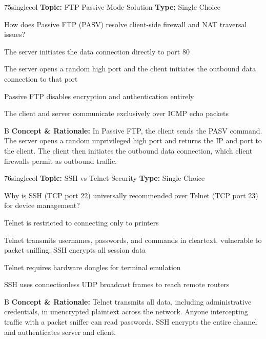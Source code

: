 \begin{qcard}{75}{singlecol}
\textcolor{darkslate!75}{\small\textbf{Topic:} FTP Passive Mode Solution \hfill \textbf{Type:} Single Choice}\vspace{0.4em}\par
How does Passive FTP (PASV) resolve client-side firewall and NAT traversal issues?
\begin{qoptions}
\item The server initiates the data connection directly to port 80
\item The server opens a random high port and the client initiates the outbound data connection to that port
\item Passive FTP disables encryption and authentication entirely
\item The client and server communicate exclusively over ICMP echo packets
\end{qoptions}
\end{qcard}
\nopagebreak
\begin{explainbox}{B}
\textbf{Concept \& Rationale:} In Passive FTP, the client sends the PASV command. The server opens a random unprivileged high port and returns the IP and port to the client. The client then initiates the outbound data connection, which client firewalls permit as outbound traffic.
\end{explainbox}

\begin{qcard}{76}{singlecol}
\textcolor{darkslate!75}{\small\textbf{Topic:} SSH vs Telnet Security \hfill \textbf{Type:} Single Choice}\vspace{0.4em}\par
Why is SSH (TCP port 22) universally recommended over Telnet (TCP port 23) for device management?
\begin{qoptions}
\item Telnet is restricted to connecting only to printers
\item Telnet transmits usernames, passwords, and commands in cleartext, vulnerable to packet sniffing; SSH encrypts all session data
\item Telnet requires hardware dongles for terminal emulation
\item SSH uses connectionless UDP broadcast frames to reach remote routers
\end{qoptions}
\end{qcard}
\nopagebreak
\begin{explainbox}{B}
\textbf{Concept \& Rationale:} Telnet transmits all data, including administrative credentials, in unencrypted plaintext across the network. Anyone intercepting traffic with a packet sniffer can read passwords. SSH encrypts the entire channel and authenticates server and client.
\end{explainbox}

